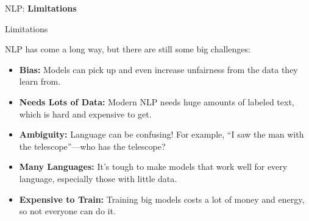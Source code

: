 \begin{frame}{}
    \LARGE NLP: \textbf{Limitations}
\end{frame}

\begin{frame}{Limitations}

NLP has come a long way, but there are still some big challenges:

\begin{itemize}
    \item \textbf{Bias:} Models can pick up and even increase unfairness from the data they learn from.
    \item \textbf{Needs Lots of Data:} Modern NLP needs huge amounts of labeled text, which is hard and expensive to get.
    \item \textbf{Ambiguity:} Language can be confusing! For example, ``I saw the man with the telescope''—who has the telescope?
    \item \textbf{Many Languages:} It's tough to make models that work well for every language, especially those with little data.
    \item \textbf{Expensive to Train:} Training big models costs a lot of money and energy, so not everyone can do it.
\end{itemize}
\end{frame}